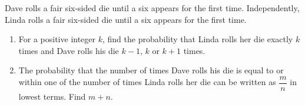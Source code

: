 Dave rolls a fair six-sided die until a six appears for the first time. Independently, Linda rolls a fair six-sided die until a six appears for the first time.
\begin{enumerate}
\item[(a)] For a positive integer $k$, find the probability that Linda rolls her die exactly $k$ times and Dave rolls his die $k-1$, $k$ or $k+1$ times.
\item[(b)] The probability that the number of times Dave rolls his die is equal to or within one of the number of times Linda rolls her die can be written as $\dfrac{m}{n}$ in lowest terms. Find $m+n$.
\end{enumerate}
